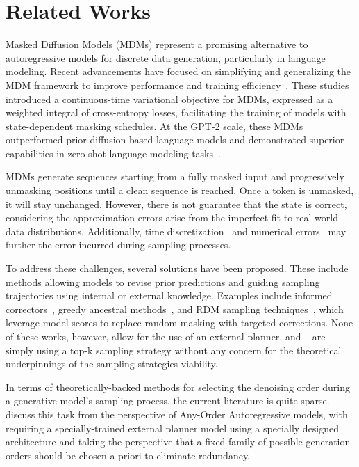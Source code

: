 \section{Related Works}
Masked Diffusion Models (MDMs) represent a promising alternative to autoregressive models for discrete data generation, particularly in language modeling. Recent advancements have focused on simplifying and generalizing the MDM framework to improve performance and training efficiency~\citep{md4, mdlm}. These studies introduced a continuous-time variational objective for MDMs, expressed as a weighted integral of cross-entropy losses, facilitating the training of models with state-dependent masking schedules. At the GPT-2 scale, these MDMs outperformed prior diffusion-based language models and demonstrated superior capabilities in zero-shot language modeling tasks~\citep{nie2024scalingmaskeddiffusionmodels,gong2024scalingdiffusionlanguagemodels}. 

MDMs generate sequences starting from a fully masked input and progressively unmasking positions until a clean sequence is reached. Once a token is unmasked, it will stay unchanged. However, there is not guarantee that the state is correct, considering the approximation errors arise from the imperfect fit to real-world data distributions. Additionally, time discretization~\citep{zhao2024informedcorrectorsdiscretediffusion} and numerical errors~\citep{zheng2024maskeddiffusionmodelssecretly} may further the error incurred during sampling processes.

To address these challenges, several solutions have been proposed. These include methods allowing models to revise prior predictions and guiding sampling trajectories using internal or external knowledge. Examples include informed correctors~\citep{zhao2024informedcorrectorsdiscretediffusion}, greedy ancestral methods~\citep{gong2024scalingdiffusionlanguagemodels}, and RDM sampling techniques~\citep{RDM, DPLM}, which leverage model scores to replace random masking with targeted corrections. None of these works, however, allow for the use of an external planner, and ~\citep{RDM, DPLM} are simply using a top-k sampling strategy without any concern for the theoretical underpinnings of the sampling strategies viability.

In terms of theoretically-backed methods for selecting the denoising order during a generative model's sampling process, the current literature is quite sparse. \cite{shih2022traininginferenceanyorderautoregressive,li2021discoveringnonmonotonicautoregressiveorderings} discuss this task from the perspective of Any-Order Autoregressive models,  with \cite{li2021discoveringnonmonotonicautoregressiveorderings} requiring a specially-trained external planner model using a specially designed architecture and \citet{shih2022traininginferenceanyorderautoregressive} taking the perspective that a fixed family of possible generation orders should be chosen a priori to eliminate redundancy.

